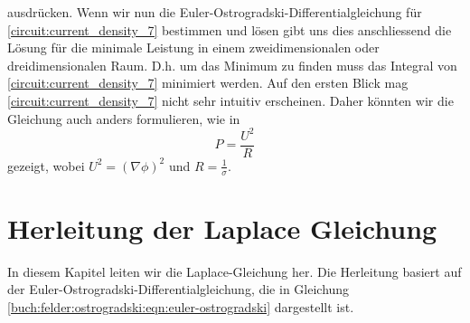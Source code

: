 ausdrücken. Wenn wir nun die Euler-Ostrogradski-Differentialgleichung für \eqref{circuit:current_density_7} bestimmen und lösen gibt uns dies anschliessend die Lösung für die minimale Leistung in einem zweidimensionalen oder dreidimensionalen Raum. D.h. um das Minimum zu finden muss das Integral von \eqref{circuit:current_density_7} minimiert werden. Auf den ersten Blick mag \eqref{circuit:current_density_7} nicht sehr intuitiv erscheinen. Daher könnten wir die Gleichung auch anders formulieren, wie in 
\begin{equation}
	P=\frac{U^2}{R}
	\label{circuit:current_density_8}
\end{equation}
gezeigt, wobei $U^2=\left( \nabla \phi \right)^2$ und $R=\frac{1}{\sigma}$.


\section{Herleitung der Laplace Gleichung}
In diesem Kapitel leiten wir die Laplace-Gleichung her. Die Herleitung basiert auf der Euler-Ostrogradski-Differentialgleichung, die in Gleichung \eqref{buch:felder:ostrogradski:eqn:euler-ostrogradski} dargestellt ist.

